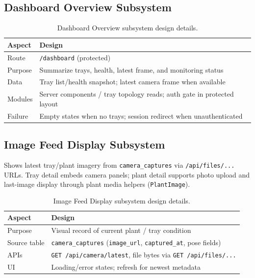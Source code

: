 \documentclass[11pt,letterpaper]{article}
\begin{document}
\subsection{Dashboard Overview Subsystem}
\begin{table}[H]
\centering
\begin{tabular}{@{}p{3.2cm}p{10.5cm}@{}}
\toprule
\textbf{Aspect} & \textbf{Design} \\
\midrule
Route & \texttt{/dashboard} (protected) \\
Purpose & Summarize trays, health, latest frame, and monitoring status \\
Data & Tray list/health snapshot; latest camera frame when available \\
Modules & Server components / tray topology reads; auth gate in protected layout \\
Failure & Empty states when no trays; session redirect when unauthenticated \\
\bottomrule
\end{tabular}
\caption{Dashboard Overview subsystem design details.}
\label{tab:dash}
\end{table}

\subsection{Image Feed Display Subsystem}
Shows latest tray/plant imagery from \texttt{camera\_captures} via \texttt{/api/files/...}
URLs. Tray detail embeds camera panels; plant detail supports photo upload and last-image
display through plant media helpers (\texttt{PlantImage}).

\begin{table}[H]
\centering
\begin{tabular}{@{}p{3.2cm}p{10.5cm}@{}}
\toprule
\textbf{Aspect} & \textbf{Design} \\
\midrule
Purpose & Visual record of current plant / tray condition \\
Source table & \texttt{camera\_captures} (\texttt{image\_url}, \texttt{captured\_at}, pose fields) \\
APIs & \texttt{GET /api/camera/latest}, file bytes via \texttt{GET /api/files/...} \\
UI & Loading/error states; refresh for newest metadata \\
\bottomrule
\end{tabular}
\caption{Image Feed Display subsystem design details.}
\label{tab:image-feed}
\end{table}
\end{document}
